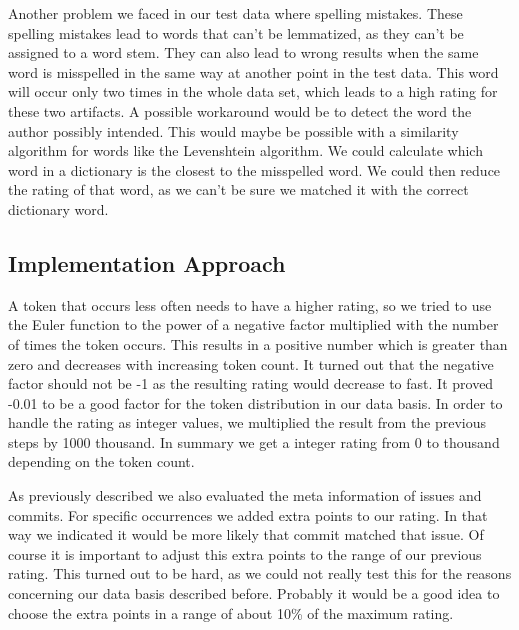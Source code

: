 Another problem we faced in our test data where spelling mistakes.
These spelling mistakes lead to words that can't be lemmatized, as they can't be assigned to a word stem.
They can also lead to wrong results when the same word is misspelled in the same way at another point in the test data.
This word will occur only two times in the whole data set, which leads to a high rating for these two artifacts.
A possible workaround would be to detect the word the author possibly intended.
This would maybe be possible with a similarity algorithm for words like the Levenshtein algorithm.
We could calculate which word in a dictionary is the closest to the misspelled word.
We could then reduce the rating of that word, as we can't be sure we matched it with the correct dictionary word.

\subsection{Implementation Approach}
A token that occurs less often needs to have a higher rating, so we tried to use the Euler function to the power of a negative factor multiplied with the number of times the token occurs.
This results in a positive number which is greater than zero and decreases with increasing token count.
It turned out that the negative factor should not be -1 as the resulting rating would decrease to fast.
It proved -0.01 to be a good factor for the token distribution in our data basis.
In order to handle the rating as integer values, we multiplied the result from the previous steps by 1000 thousand.
In summary we get a integer rating from 0 to thousand depending on the token count.

As previously described we also evaluated the meta information of issues and commits.
For specific occurrences we added extra points to our rating. In that way we indicated it would be more likely that commit matched that issue.
Of course it is important to adjust this extra points to the range of our previous rating.
This turned out to be hard, as we could not really test this for the reasons concerning our data basis described before.
Probably it would be a good idea to choose the extra points in a range of about 10\% of the maximum rating.
